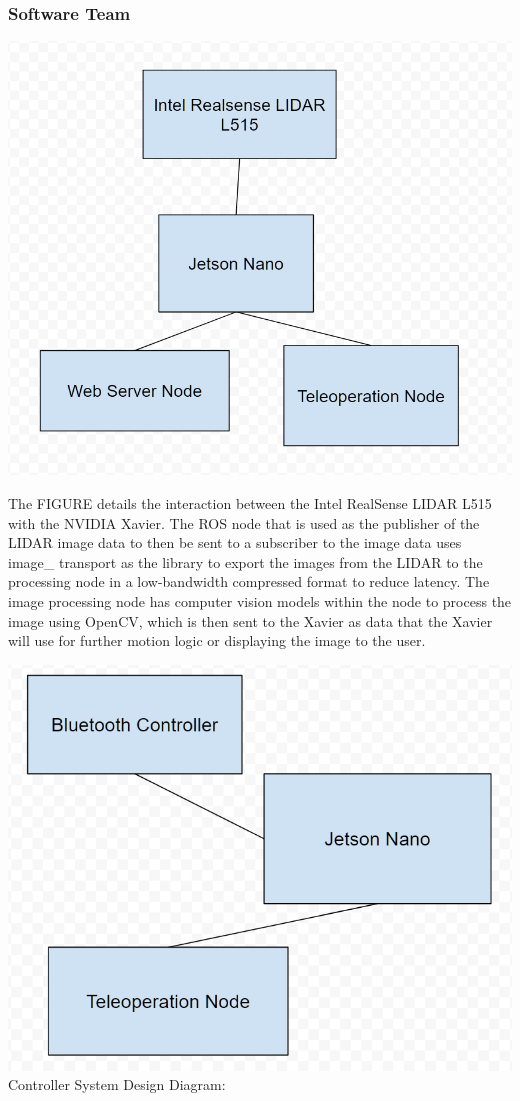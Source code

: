 \documentclass[a4paper, 10pt]{article}
\begin{document}
		\subsubsection{Software Team}

		\includegraphics[scale=0.3]{Photos/LIDAR nodes}

		The FIGURE details the interaction between the Intel RealSense LIDAR L515 with the NVIDIA Xavier. The ROS node that is used as the publisher of the LIDAR image data to then be sent to a subscriber to the image data uses image\_ transport as the library to export the images from the LIDAR to the processing node in a low-bandwidth compressed format to reduce latency. The image processing node has computer vision models within the node to process the image using OpenCV, which is then sent to the Xavier as data that the Xavier will use for further motion logic or displaying the image to the user.

		\includegraphics[scale=0.3]{Photos/controller node} Controller System Design Diagram:
\end{document}
